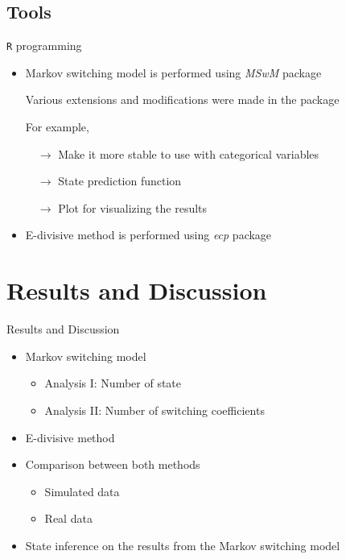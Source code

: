\documentclass{beamer}
\begin{document}
\subsection{Tools}
\begin{frame}
\texttt{R} programming

\begin{itemize}
	\item Markov switching model is performed using \textit{MSwM} package \cite{p2}

Various extensions and modifications were made in the package

For example, 

$\quad \rightarrow$ Make it more stable to use with categorical variables

$\quad \rightarrow$ State prediction function

$\quad \rightarrow$ Plot for visualizing the results

	\item E-divisive method is performed using \textit{ecp} package \cite{p3}
\end{itemize}

\end{frame}

\section{Results and Discussion}

\begin{frame}
Results and Discussion

\begin{itemize}
	\item Markov switching model
	\begin{itemize}
		\item Analysis I: Number of state
		\item Analysis II: Number of switching coefficients
	\end{itemize}
	
		\item E-divisive method
		\item Comparison between both methods
	\begin{itemize}
		\item Simulated data
		\item Real data
	\end{itemize}
	
	\item State inference on the results from the Markov switching model
\end{itemize}

\end{frame}
\end{document}

